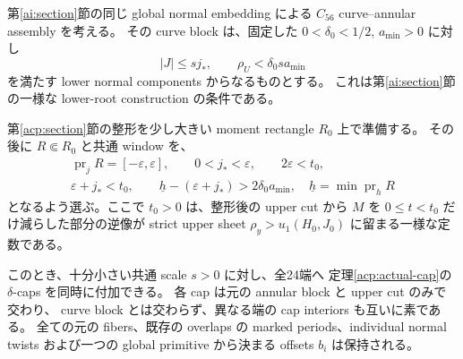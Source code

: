 \begin{corollary}
\label{acp:assembly-caps}
第\ref{ai:section}節の同じ global normal embedding による
$C_{56}$ curve--annular assembly を考える。
その curve block は、固定した $0<\delta_0<1/2$, $a_{\min}>0$ に対し
\begin{equation}\label{acp:global-lower-cutoff}
 |J|\le s j_*,\qquad \rho_U<\delta_0sa_{\min}
\end{equation}
を満たす lower normal components からなるものとする。
これは第\ref{ai:section}節の一様な lower-root construction の条件である。

第\ref{acp:section}節の整形を少し大きい moment rectangle $R_0$ 上で準備する。
その後に $R\Subset R_0$ と共通 window を、
\begin{gather*}
 \operatorname{pr}_jR=[-\varepsilon,\varepsilon],\qquad
 0<j_*<\varepsilon,\qquad 2\varepsilon<t_0,\\
 \varepsilon+j_*<t_0,\qquad
 \underline h-(\varepsilon+j_*)>2\delta_0a_{\min},
 \quad \underline h=\min\operatorname{pr}_hR
\end{gather*}
となるよう選ぶ。ここで $t_0>0$ は、整形後の upper cut から
$M$ を $0\le t<t_0$ だけ減らした部分の逆像が strict upper sheet
$\rho_y>u_1(H_0,J_0)$ に留まる一様な定数である。

このとき、十分小さい共通 scale $s>0$ に対し、全24端へ
定理\ref{acp:actual-cap}の $\delta$-caps を同時に付加できる。
各 cap は元の annular block と upper cut のみで交わり、
curve block とは交わらず、異なる端の cap interiors も互いに素である。
全ての元の fibers、既存の overlaps の marked periods、individual normal twists
および一つの global primitive から決まる offsets $b_i$ は保持される。
\end{corollary}

